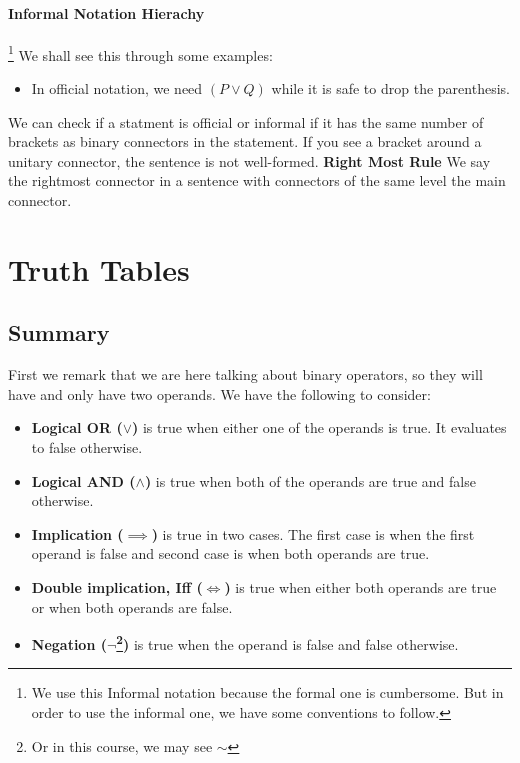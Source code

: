 \documentclass[11pt]{article}
\begin{document}
\paragraph{Informal Notation Hierachy}\footnote{We use this Informal notation because the formal one is cumbersome. But in order to use the informal one, we have some conventions to follow.} 
We shall see this through some examples:
\begin{itemize}
    \item In official notation, we need $(P\vee Q)$ while it is safe to drop the parenthesis.
\end{itemize}
We can check if a statment is official or informal if it has the same number of brackets as binary connectors in the statement. If you see a bracket around a unitary connector, the sentence is not well-formed.
\textbf{Right Most Rule} We say the rightmost connector in a sentence with connectors of the same level the main connector.



\section{Truth Tables}
\subsection{Summary} First we remark that we are here talking about binary operators, 
so they will have and only have two operands. We have the following to consider:
\begin{itemize}
    \item \textbf{Logical OR ($\vee$)} is true when either one of the operands is true. 
        It evaluates to false otherwise.
    \item \textbf{Logical AND ($\land$)} is true when both of the operands are true and false otherwise.
    \item \textbf{Implication ($\implies$)} is true in two cases. The first case is when the
        first operand is false and second case is when both operands are true.
    \item \textbf{Double implication, Iff ($\iff$)} is true when either both operands are true 
        or when both operands are false.
    \item \textbf{Negation ($\neg$\footnote{Or in this course, we may see $\sim$})} is true when the operand
        is false and false otherwise.
\end{itemize}
\end{document}
